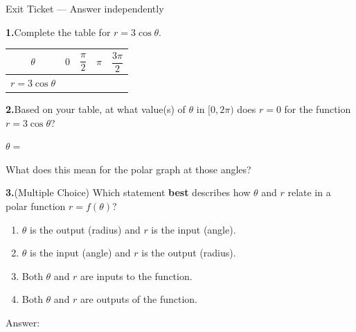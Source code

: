 \documentclass[10pt]{article}
\begin{document}
\namedateperiod

\vspace{0.12in}

\begin{notesbox}{Exit Ticket --- Answer independently}

\textbf{1.}\quad Complete the table for $r = 3\cos\theta$.

\vspace{4pt}
\renewcommand{\arraystretch}{1.7}
\begin{tabular}{|c|c|c|c|c|}
\hline
$\theta$ & $0$ & $\dfrac{\pi}{2}$ & $\pi$ & $\dfrac{3\pi}{2}$ \\
\hline
$r = 3\cos\theta$ & & & & \\[4pt]
\hline
\end{tabular}

\vspace{0.18in}
\textbf{2.}\quad Based on your table, at what value(s) of $\theta$ in $[0, 2\pi)$
does $r = 0$ for the function $r = 3\cos\theta$?

\vspace{6pt}
$\theta = $ \underline{\hspace{4cm}}

\vspace{6pt}
What does this mean for the polar graph at those angles?

\writeline

\vspace{0.16in}
\textbf{3.}\quad (Multiple Choice) Which statement \textbf{best} describes how $\theta$
and $r$ relate in a polar function $r = f(\theta)$?

\vspace{6pt}
\begin{enumerate}[label=(\Alph*), leftmargin=2em, itemsep=6pt]
  \item $\theta$ is the output (radius) and $r$ is the input (angle).
  \item $\theta$ is the input (angle) and $r$ is the output (radius).
  \item Both $\theta$ and $r$ are inputs to the function.
  \item Both $\theta$ and $r$ are outputs of the function.
\end{enumerate}

\vspace{4pt}
Answer: \underline{\hspace{1.5cm}}

\end{notesbox}
\end{document}

